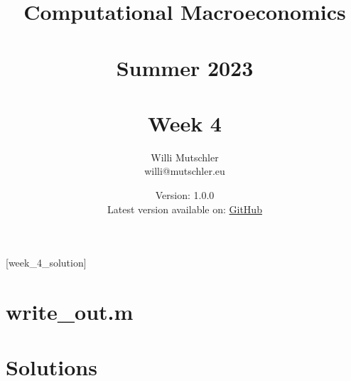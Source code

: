 
\newif\ifDisplaySolutions\DisplaySolutionstrue


\title{Computational Macroeconomics\\~\\Summer 2023\\~\\Week 4}
\author{Willi Mutschler\\willi@mutschler.eu}
\date{Version: 1.0.0\\Latest version available on: \href{https://github.com/wmutschl/Computational-Macroeconomics/releases/latest/download/week_4.pdf}{GitHub}}
\maketitle\thispagestyle{empty}

\newpage
{}[week_4_solution]
\tableofcontents\thispagestyle{empty}\newpage

\setcounter{page}{1}
\newpage
\newpage
\newpage

\appendix
\section{write\_out.m\label{app:write_out}}


\printbibliography
\newpage

\ifDisplaySolutions
\newpage
\appendix
\section{Solutions}

\fi
